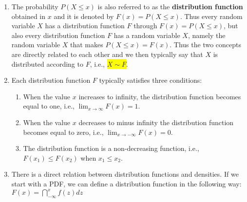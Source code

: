 \begin{enumerate}
    \item The probability $P(X \leq x)$ is also referred to as the \textbf{distribution function} obtained in $x$ and it is denoted by $F(x) = P(X \leq x)$. 
    Thus every random variable $X$ has a distribution function $F$ through $F(x) = P(X \leq x)$, but also every distribution function $F$ has a random variable $X$, namely the random variable $X$ that makes $P(X \leq x) = F(x)$.
    Thus the two concepts are directly related to each other and we then typically say that $X$ is distributed according to $F$, i.e., \colorbox{yellow}{$X \sim F$}.
    \hfill \cite{statistics/book/Statistics-for-Data-Scientists/Maurits-Kaptein}

    \item Each distribution function $F$ typically satisfies three conditions:
    \begin{enumerate}
        \item When the value $x$ increases to infinity, the distribution function becomes equal to one, i.e., $\lim _{x\to \infty} F(x) = 1$. 
        \hfill \cite{statistics/book/Statistics-for-Data-Scientists/Maurits-Kaptein}

        \item When the value $x$ decreases to minus infinity the distribution function becomes equal to zero, i.e., $\lim _{x\to -\infty} F(x) = 0$. 
        \hfill \cite{statistics/book/Statistics-for-Data-Scientists/Maurits-Kaptein}

        \item The distribution function is a non-decreasing function, i.e., $F(x_1) \leq F(x_2)$ when $x_1 \leq x_2$.
        \hfill \cite{statistics/book/Statistics-for-Data-Scientists/Maurits-Kaptein}
    \end{enumerate}

    \item There is a direct relation between distribution functions and densities. 
    If we start with a PDF, we can define a distribution function in the following way:
    $
        F(x) = \dint_{-\infty}^{x} f(z) dz
    $
    \hfill \cite{statistics/book/Statistics-for-Data-Scientists/Maurits-Kaptein}


\end{enumerate}
